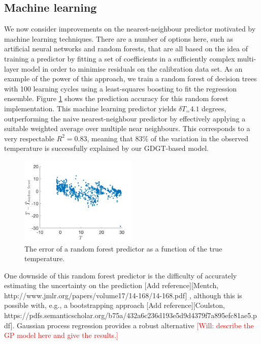 \documentclass[rmp,aps,twocolumn]{revtex4-1}
\newcommand{\todo}[1]{\textcolor{red}{#1}}
\newcommand{\citeme}{{\color{blue} [Add reference]}}
\begin{document}
\subsection{Machine learning}

We now consider improvements on the nearest-neighbour predictor motivated by machine learning techniques.  There are a number of options here, such as artificial neural networks and random forests, that are all based on the idea of training a predictor by fitting a set of coefficients in a sufficiently complex multi-layer model in order to minimise residuals on the calibration data set.  As an example of the power of this approach, we train a random forest of decision trees with 100 learning cycles using a least-squares boosting to fit the regression ensemble.  Figure \ref{fig:randomforest} shows the prediction accuracy for this random forest implementation.  This machine learning predictor yields $\delta T_\mathrm = 4.1$ degrees, outperforming the naive nearest-neighbour predictor by effectively applying a suitable weighted average over multiple near neighbours.  This corresponds to a very respectable $R^2 = 0.83$, meaning that 83\% of the variation in the observed temperature is successfully explained by our GDGT-based model.

\begin{figure}
	\centering
	\includegraphics[width=0.5\textwidth]{Trandomforest.png}
	\caption{\label{fig:randomforest}  The error of a random forest predictor as a function of the true temperature.}
\end{figure}


One downside of this random forest predictor is the difficulty of accurately estimating the uncertainty on the prediction \citeme [Mentch, http://www.jmlr.org/papers/volume17/14-168/14-168.pdf] , although this is possible with, e.g., a bootstrapping approach \citeme [Coulston, https://pdfs.semanticscholar.org/b75a/432a6c236d193e5d9d4379f7a895efc81ae5.pdf].  Gaussian process regression provides a robust alternative 
\todo{[Will: describe the GP model here and give the results.]}
\end{document}
